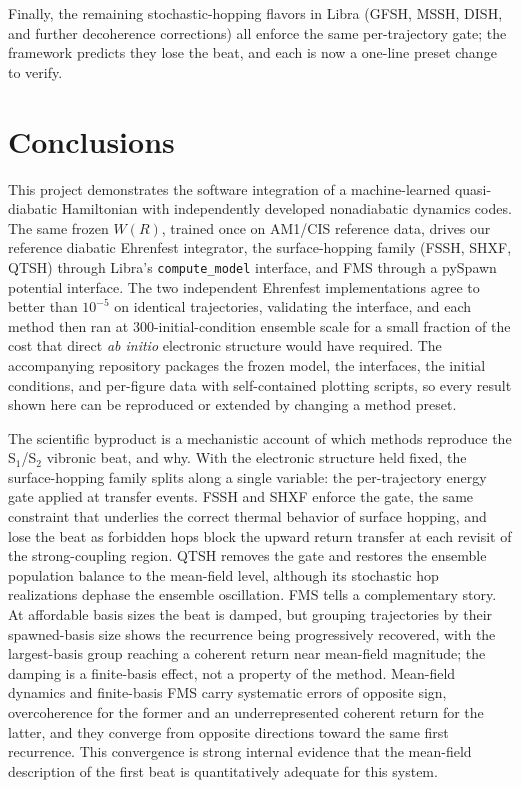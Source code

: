 \documentclass[11pt]{article}
\begin{document}
Finally, the remaining stochastic-hopping flavors in Libra (GFSH, MSSH, DISH, and further decoherence corrections) all enforce the same per-trajectory gate; the framework predicts they lose the beat, and each is now a one-line preset change to verify.

\section{Conclusions}
This project demonstrates the software integration of a machine-learned quasi-diabatic Hamiltonian with independently developed nonadiabatic dynamics codes. The same frozen $W(R)$, trained once on AM1/CIS reference data, drives our reference diabatic Ehrenfest integrator, the surface-hopping family (FSSH, SHXF, QTSH) through Libra's \texttt{compute\_model} interface, and FMS through a pySpawn potential interface. The two independent Ehrenfest implementations agree to better than $10^{-5}$ on identical trajectories, validating the interface, and each method then ran at $300$-initial-condition ensemble scale for a small fraction of the cost that direct \textit{ab initio} electronic structure would have required. The accompanying repository packages the frozen model, the interfaces, the initial conditions, and per-figure data with self-contained plotting scripts, so every result shown here can be reproduced or extended by changing a method preset.

The scientific byproduct is a mechanistic account of which methods reproduce the S$_1$/S$_2$ vibronic beat, and why. With the electronic structure held fixed, the surface-hopping family splits along a single variable: the per-trajectory energy gate applied at transfer events. FSSH and SHXF enforce the gate, the same constraint that underlies the correct thermal behavior of surface hopping, and lose the beat as forbidden hops block the upward return transfer at each revisit of the strong-coupling region. QTSH removes the gate and restores the ensemble population balance to the mean-field level, although its stochastic hop realizations dephase the ensemble oscillation. FMS tells a complementary story. At affordable basis sizes the beat is damped, but grouping trajectories by their spawned-basis size shows the recurrence being progressively recovered, with the largest-basis group reaching a coherent return near mean-field magnitude; the damping is a finite-basis effect, not a property of the method. Mean-field dynamics and finite-basis FMS carry systematic errors of opposite sign, overcoherence for the former and an underrepresented coherent return for the latter, and they converge from opposite directions toward the same first recurrence. This convergence is strong internal evidence that the mean-field description of the first beat is quantitatively adequate for this system.
\end{document}
